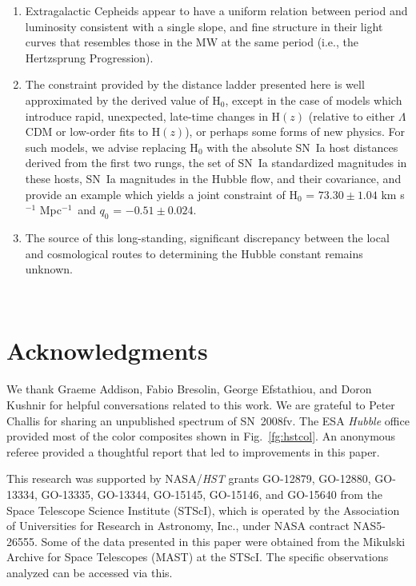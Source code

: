 \documentclass[12pt]{aastex631}
\newcommand{\hhiz}{$ 73.30 \pm 1.04 $ km s$^{-1}$ Mpc$^{-1}$}
\newcommand{\qhiz}{$ -0.51 \pm 0.024 $}
\begin{document}
\begin{enumerate}
\item Extragalactic Cepheids appear to have a uniform relation between period and luminosity consistent with a single slope, and fine structure in their light curves that resembles those in the MW at the same period (i.e., the Hertzsprung Progression).
   
\item The constraint provided by the distance ladder presented here is well approximated by the derived value of H$_0$, except in the case of models which introduce rapid, unexpected, late-time changes in H$(z)$ (relative to either $\Lambda$CDM or low-order fits to H$(z)$), or perhaps some forms of new physics. For such models, we advise replacing H$_0$ with the absolute SN~Ia host distances derived from the first two rungs, the set of SN~Ia standardized magnitudes in these hosts, SN~Ia magnitudes in the Hubble flow, and their covariance, and provide an example which yields a joint constraint of H$_0$ = \hhiz\ and $q_0$ = \qhiz.
   
\item The source of this long-standing, significant discrepancy between the local and cosmological routes to determining the Hubble constant remains unknown.
     
\end{enumerate}

\ \par

\section{Acknowledgments}

We thank Graeme Addison, Fabio Bresolin, George Efstathiou, and Doron Kushnir for helpful conversations related to this work. We are grateful to Peter Challis for sharing an unpublished spectrum of SN~2008fv. The ESA {\it Hubble} office provided most of the color composites shown in Fig.~\ref{fg:hstcol}.
An anonymous referee provided a thoughtful report that led to improvements in this paper.

This research was supported by NASA/{\it HST} grants GO-12879, GO-12880, GO-13334, GO-13335, GO-13344, GO-15145, GO-15146, and GO-15640 from the Space Telescope Science Institute (STScI), which is operated by the Association of Universities for Research in Astronomy, Inc., under NASA contract NAS5-26555. Some of the data presented in this paper were obtained from the Mikulski Archive for Space Telescopes (MAST) at the STScI. The specific observations analyzed can be accessed via this.
\end{document}
